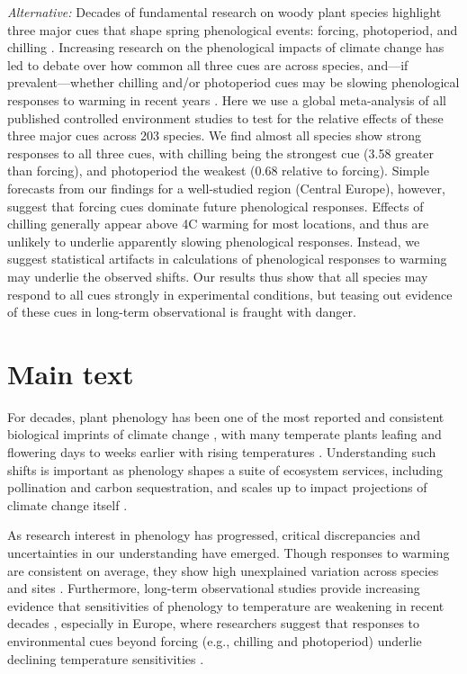 \documentclass{article}
\begin{document}
\emph{Alternative:} Decades of fundamental research on woody plant species highlight three major cues that shape spring phenological events: forcing, photoperiod, and chilling \citep[e.g.,][]{Campbell:1975aa,Heide:2008aa,flynn2018}. Increasing research on the phenological impacts of climate change has led to debate over how common all three cues are across species, and---if prevalent---whether chilling and/or photoperiod cues may be slowing phenological responses to warming in recent years \citep{Heide:2011aa,koerner2010b,fu2015,zohner2016}. Here we use a global meta-analysis of all published controlled environment studies to test for the relative effects of these three major cues across 203 species. We find almost all species show strong responses to all three cues, with chilling being the strongest cue (3.58 greater than forcing), and photoperiod the weakest (0.68 relative to forcing). Simple forecasts from our findings for a well-studied region (Central Europe), however, suggest that forcing cues dominate future phenological responses. Effects of chilling generally appear above 4\degree C warming for most locations, and thus are unlikely to underlie apparently slowing phenological responses. Instead, we suggest statistical artifacts in calculations of phenological responses to warming may underlie the observed shifts. Our results thus show that all species may respond to all cues strongly in experimental conditions, but teasing out evidence of these cues in long-term observational is fraught with danger.


\section* {Main text}

\par For decades, plant phenology has been one of the most reported and consistent biological imprints of climate change \citep{IPCC:2014sm}, with many temperate plants leafing and flowering days to weeks earlier with rising temperatures \citep{millerrushing2008,menzel2006}. Understanding such shifts is important as phenology shapes a suite of ecosystem services, including pollination and carbon sequestration, and scales up to impact projections of climate change itself \cite{Cleland:2007or}.

\par As research interest in phenology has progressed, critical discrepancies and uncertainties in our understanding have emerged. Though responses to warming are consistent on average, they show high unexplained variation across species and sites \citep{Wolkovich:2012n}. Furthermore, long-term observational studies provide increasing evidence that sensitivities of phenology to temperature are weakening in recent decades \cite{Rutishauser:2008,yu2010}, especially in Europe, where researchers suggest that responses to environmental cues beyond forcing (e.g., chilling and photoperiod) underlie declining temperature sensitivities \cite{fu2015}.
\end{document}
